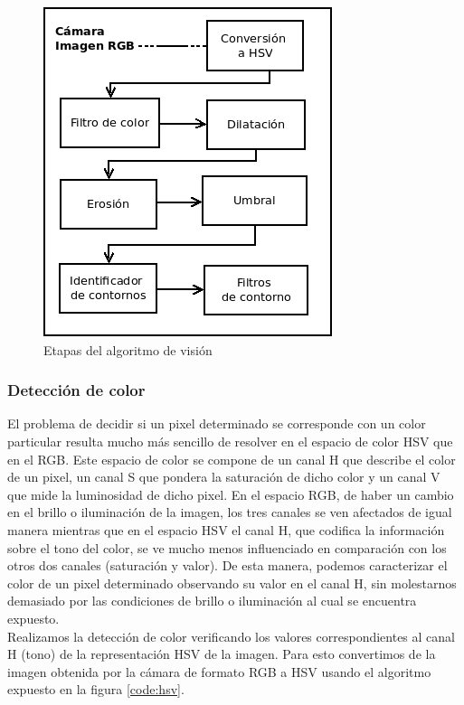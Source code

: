 \begin{figure}[tpb]
\begin{center}
  \includegraphics[scale=0.6]{vision/figures/vision-flow.png}
\end{center}
  \caption[Etapas del algoritmo de visi\'on]{Etapas del algoritmo de visi\'on}
  \label{fig:alg_steps}
\end{figure}


\subsubsection{\label{sec:color} Detecci\'on de color}
El problema de decidir si un pixel determinado se corresponde con un 
color particular resulta mucho m\'as sencillo de resolver en el espacio 
de color HSV que en el RGB. Este espacio de color se compone de un canal H que 
describe el color de un pixel, un canal S que pondera la saturaci\'on de 
dicho color y un canal V que mide la luminosidad de dicho pixel. En el espacio RGB, de haber un cambio en el brillo o 
iluminaci\'on de la imagen, los tres canales se ven afectados de igual 
manera mientras que en el espacio HSV el canal H, que codifica la 
informaci\'on sobre el tono del color, se ve mucho menos influenciado en 
comparaci\'on con los otros dos canales (saturaci\'on y valor). De esta 
manera, podemos caracterizar el color de un pixel determinado 
observando su valor en el canal H, sin molestarnos demasiado por las condiciones de brillo o iluminaci\'on al cual se encuentra expuesto.
\\ \indent Realizamos la detecci\'on de color verificando los valores 
correspondientes al canal H (tono) de la representaci\'on HSV de la 
imagen. Para esto convertimos de la imagen obtenida por la c\'amara  de formato RGB a HSV usando el algoritmo expuesto en la figura \ref{code:hsv}.


